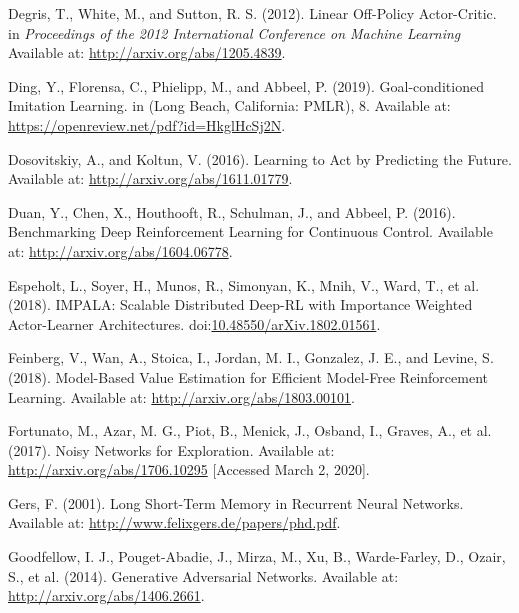 \documentclass[
  letterpaper,
  DIV=11,
  numbers=noendperiod]{scrreprt}
\newlength{\cslhangindent}
\newlength{\cslentryspacingunit} %
\newenvironment{CSLReferences}[2] %
 {%
  \setlength{\parindent}{0pt}
  \ifodd #1
  \let\oldpar\par
  \def\par{\hangindent=\cslhangindent\oldpar}
  \fi
  \setlength{\parskip}{#2\cslentryspacingunit}
 }%
 {}
\begin{document}
\begin{CSLReferences}{1}{0}
\leavevmode{}%
Degris, T., White, M., and Sutton, R. S. (2012). Linear {Off-Policy
Actor-Critic}. in \emph{Proceedings of the 2012 {International
Conference} on {Machine Learning}} Available at:
\url{http://arxiv.org/abs/1205.4839}.

\leavevmode{}%
Ding, Y., Florensa, C., Phielipp, M., and Abbeel, P. (2019).
Goal-conditioned {Imitation Learning}. in ({Long Beach, California}:
{PMLR}), 8. Available at:
\url{https://openreview.net/pdf?id=HkglHcSj2N}.

\leavevmode{}%
Dosovitskiy, A., and Koltun, V. (2016). Learning to {Act} by
{Predicting} the {Future}. Available at:
\url{http://arxiv.org/abs/1611.01779}.

\leavevmode{}%
Duan, Y., Chen, X., Houthooft, R., Schulman, J., and Abbeel, P. (2016).
Benchmarking {Deep Reinforcement Learning} for {Continuous Control}.
Available at: \url{http://arxiv.org/abs/1604.06778}.

\leavevmode{}%
Espeholt, L., Soyer, H., Munos, R., Simonyan, K., Mnih, V., Ward, T., et
al. (2018). {IMPALA}: {Scalable Distributed Deep-RL} with {Importance
Weighted Actor-Learner Architectures}.
doi:\href{https://doi.org/10.48550/arXiv.1802.01561}{10.48550/arXiv.1802.01561}.

\leavevmode{}%
Feinberg, V., Wan, A., Stoica, I., Jordan, M. I., Gonzalez, J. E., and
Levine, S. (2018). Model-{Based Value Estimation} for {Efficient
Model-Free Reinforcement Learning}. Available at:
\url{http://arxiv.org/abs/1803.00101}.

\leavevmode{}%
Fortunato, M., Azar, M. G., Piot, B., Menick, J., Osband, I., Graves,
A., et al. (2017). Noisy {Networks} for {Exploration}. Available at:
\url{http://arxiv.org/abs/1706.10295} {[}Accessed March 2, 2020{]}.

\leavevmode{}%
Gers, F. (2001). Long {Short-Term Memory} in {Recurrent Neural
Networks}. Available at: \url{http://www.felixgers.de/papers/phd.pdf}.

\leavevmode{}%
Goodfellow, I. J., Pouget-Abadie, J., Mirza, M., Xu, B., Warde-Farley,
D., Ozair, S., et al. (2014). Generative {Adversarial Networks}.
Available at: \url{http://arxiv.org/abs/1406.2661}.


\end{CSLReferences}
\end{document}
